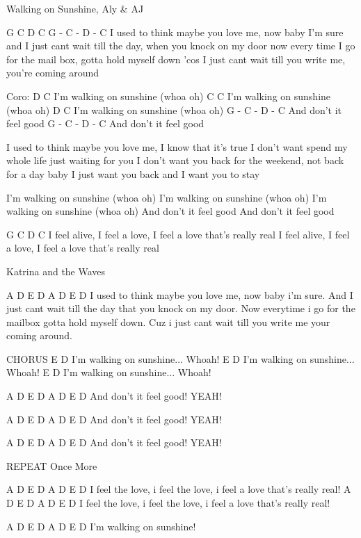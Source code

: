 
Walking on Sunshine, Aly & AJ

	  G                       C         D                  C             G - C - D - C  
I used to think maybe you love me, now baby I'm sure  
and I just cant wait till the day, when you knock on my door  
now every time I go for the mail box, gotta hold myself down  
'cos I just cant wait till you write me, you're coming around  

{Coro:}  
                            D            C 
I'm walking on sunshine (whoa oh)  
                       C                   C  
I'm walking on sunshine (whoa oh)  
                        D                  C  
I'm walking on sunshine (whoa oh)  
                                G - C - D - C  
And don't it feel good  
                               G - C - D - C  
And don't it feel good  

I used to think maybe you love me, I know that it's true  
I don't want spend my whole life just waiting for you  
I don't want you back for the weekend, not back for a day  
baby I just want you back and I want you to stay  

I'm walking on sunshine (whoa oh)  
I'm walking on sunshine (whoa oh)  
I'm walking on sunshine (whoa oh)  
And don't it feel good  
And don't it feel good  

        G                C              D                     C  
I feel alive, I feel a love, I feel a love that's really real  
I feel alive, I feel a love, I feel a love that's really real  









Katrina and the Waves

   A             D         E        D            A D E D   
I used to think maybe you love me, now baby i'm sure.
And I just cant wait till the day that you knock on my door.
Now everytime i go for the mailbox gotta hold myself down.
Cuz i just cant wait till you write me your coming around.

CHORUS
                  E           D
I'm walking on sunshine... Whoah!
                  E           D
I'm walking on sunshine... Whoah!
                  E           D
I'm walking on sunshine... Whoah!

A D E D A D E D 
And don't it feel good!
YEAH!

A D E D A D E D 
And don't it feel good!
YEAH!

A D E D A D E D 
And don't it feel good!
YEAH!

REPEAT Once More

A D E D A D E D 
I feel the love, i feel the love, i feel a love that's really real!
A D E D A D E D 
I feel the love, i feel the love, i feel a love that's really real!

A D E D A D E D
I'm walking on sunshine! 
